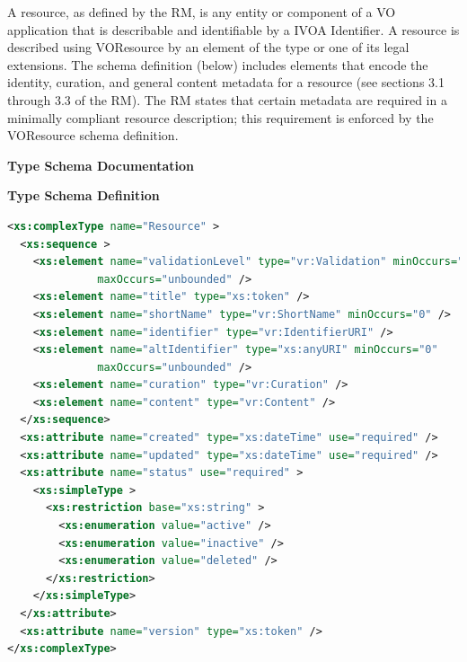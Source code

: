 \documentclass[11pt,a4paper]{ivoa}
\begin{document}
\label{sect:restype}

A resource, as defined by the RM, is any entity or component of a VO
application that is describable and identifiable by a IVOA Identifier.
A resource is described using VOResource by an element of the type
 or one of its legal extensions.  The schema
definition (below) includes elements that encode the identity, curation,
and general content metadata for a resource (see sections 3.1 through
3.3 of the RM).  The RM states that certain metadata are required in a
minimally compliant resource description; this requirement is enforced
by the VOResource schema definition.  

\goodbreak

\begin{generated}
\begingroup
      	\renewcommand*\descriptionlabel[1]{%
      	\hbox to 5.5em{\emph{#1}\hfil}}\vspace{2ex}\noindent\textbf{ Type Schema Documentation}


\vspace{1ex}\noindent\textbf{ Type Schema Definition}

\begin{lstlisting}[language=XML,basicstyle=\footnotesize]
<xs:complexType name="Resource" >
  <xs:sequence >
    <xs:element name="validationLevel" type="vr:Validation" minOccurs="0"
              maxOccurs="unbounded" />
    <xs:element name="title" type="xs:token" />
    <xs:element name="shortName" type="vr:ShortName" minOccurs="0" />
    <xs:element name="identifier" type="vr:IdentifierURI" />
    <xs:element name="altIdentifier" type="xs:anyURI" minOccurs="0"
              maxOccurs="unbounded" />
    <xs:element name="curation" type="vr:Curation" />
    <xs:element name="content" type="vr:Content" />
  </xs:sequence>
  <xs:attribute name="created" type="xs:dateTime" use="required" />
  <xs:attribute name="updated" type="xs:dateTime" use="required" />
  <xs:attribute name="status" use="required" >
    <xs:simpleType >
      <xs:restriction base="xs:string" >
        <xs:enumeration value="active" />
        <xs:enumeration value="inactive" />
        <xs:enumeration value="deleted" />
      </xs:restriction>
    </xs:simpleType>
  </xs:attribute>
  <xs:attribute name="version" type="xs:token" />
</xs:complexType>
\end{lstlisting}


\end{generated}
\end{document}
